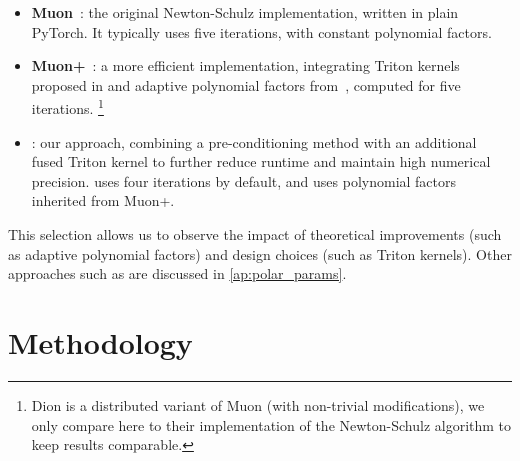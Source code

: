 \begin{itemize}
    \item \textbf{Muon}~\cite{jordan2024muon}: the original Newton-Schulz implementation, written in plain PyTorch. It typically uses five iterations, with constant polynomial factors.
    \item \textbf{Muon+}~\cite{ahn_dion_2025}: a more efficient implementation, integrating Triton kernels~\cite{tillet2019triton} proposed in \cite{ahn_dion_2025} and adaptive polynomial factors from~\cite{cesista2025muonoptcoeffs}, computed for five iterations. \footnote{Dion is a distributed variant of Muon (with non-trivial modifications), we only compare here to their implementation of the Newton-Schulz algorithm to keep results comparable.}
    \item \textbf{\turbomuon}: our approach, combining a pre-conditioning method with an additional fused Triton kernel to further reduce runtime and maintain high numerical precision. \turbomuon uses four iterations by default, and uses polynomial factors inherited from Muon+.
\end{itemize}
This selection allows us to observe the impact of theoretical improvements (such as adaptive polynomial factors) and design choices (such as Triton kernels). Other approaches such as \cite{grishina_accelerating_2025, amsel2025polar} are discussed in \cref{ap:polar_params}.

\section{Methodology
}

